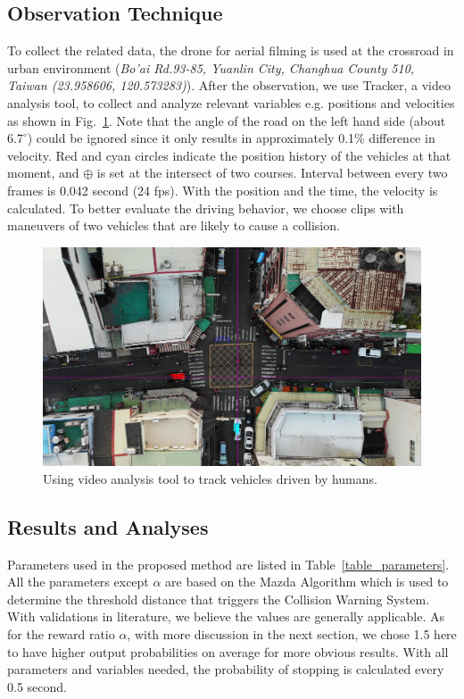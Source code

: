 \documentclass[twocolumn,10pt]{asme2e}
\begin{document}
\subsection{Observation Technique}
To collect the related data, the drone for aerial filming is used at the crossroad in urban environment (\textit{Bo’ai Rd.93-85, Yuanlin City, Changhua County 510, Taiwan (23.958606, 120.573283)}). After the observation, we use Tracker, a video analysis tool, to collect and analyze relevant variables e.g. positions and velocities as shown in Fig.~\ref{aerial_filming}. Note that the angle of the road on the left hand side (about $6.7^\circ$) could be ignored since it only results in approximately 0.1\% difference in velocity. Red and cyan circles indicate the position history of the vehicles at that moment, and $\oplus$ is set at the intersect of two courses. Interval between every two frames is 0.042 second (24 fps). With the position and the time, the velocity is calculated. To better evaluate the driving behavior, we choose clips with maneuvers of two vehicles that are likely to cause a collision. 

\begin{figure}[htbp!]
\begin{center}
\includegraphics[scale=0.17]{aerial_filming_demo.png}
\end{center}
\caption{Using video analysis tool to track vehicles driven by humans.}
\label{aerial_filming} 
\end{figure}


\subsection{Results and Analyses}

Parameters used in the proposed method are listed in Table~\ref{table_parameters}. All the parameters except $\alpha$ are based on the Mazda Algorithm \cite{CWD} which is used to determine the threshold distance that triggers the Collision Warning System. With validations in literature, we believe the values are generally applicable. As for the reward ratio $\alpha$, with more discussion in the next section, we chose 1.5 here to have higher output probabilities on average for more obvious results. With all parameters and variables needed, the probability of stopping is calculated every 0.5 second.
\end{document}
